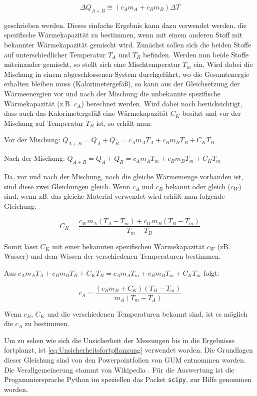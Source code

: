 \documentclass[11pt, ngerman]{scrartcl}
\begin{document}
\begin{equation}
    \Delta Q_{A+B} \cong (c_A m_A + c_B m_B) \Delta T
\end{equation}

geschrieben werden. Dieses einfache Ergebnis kann dazu verwendet werden, die
spezifische Wärmekapazität zu bestimmen, wenn mit einem anderen Stoff mit
bekannter Wärmekapazität gemischt wird. Zunächst sollen sich die beiden Stoffe
auf unterschiedlicher Temperatur $T_A$ und $T_B$ befinden. Werden nun beide Stoffe
miteinander gemischt, so stellt sich eine Mischtemperatur $T_m$ ein. Wird dabei
die Mischung in einem abgeschlossenen System durchgeführt, wo die Gesamtenergie
erhalten bleiben muss (Kalorimetergefäß), so kann aus der Gleichsetzung der
Wärmeenergien vor und nach der Mischung die unbekannte spezifische
Wärmekapazität (z.B. $c_A$) berechnet werden. Wird dabei noch berücksichtigt, dass
auch das Kalorimetergefäß eine Wärmekapazität $C_K$ besitzt und vor der Mischung
auf Temperatur $T_B$ ist, so erhält man: 

Vor der Mischung: $Q_{A+B} = Q_A + Q_B =  c_A m_A T_A + c_B m_B T_B + C_K T_B$ 

Nach der Mischung: $Q_{A+B} = Q_A + Q_B = c_A m_A T_m + c_B m_B T_m + C_K T_m$ 

Da, vor und nach der Mischung, noch die gleiche Wärmemenge vorhanden ist, sind
diese zwei Gleichungen gleich.  Wenn $c_A$ und $c_B$ bekannt oder gleich ($c_W$)
sind, wenn zB. das gleiche Material verwendet wird erhält man folgende Gleichung:

\begin{equation}
    C_K = \frac{c_W m_A (T_A-T_m) + c_W m_B (T_B-T_m)}{T_m-T_B} \label{eq:warmegefaes}
\end{equation}

Somit lässt $C_K$ mit einer bekannten spezifischen Wärmekapazität $c_W$ (zB.
Wasser) und dem Wissen der verschiedenen Temperaturen bestimmen.

Aus $c_A m_A T_A + c_B m_B T_B + C_K T_B = c_A m_A T_m + c_B m_B T_m + C_K T_m$ 
folgt:

\begin{equation}
    c_A = \frac{(c_B m_B + C_K) (T_B - T_m)}{m_A (T_m - T_A)} \label{eq:warmestoff}
\end{equation}

Wenn $c_B$, $C_K$ und die verschiedenen Temperaturen bekannt sind, 
ist es möglich die $c_A$ zu bestimmen.

Um zu sehen wie sich die Unsicherheit der Messungen bis in die Ergebnisse 
fortplanzt, ist \autoref{eq:Unsicherheitsfortpflanzung} verwendet worden.
Die Grundlagen dieser Gleichung sind von den Powerpointfolien von 
GUM entnommen worden.\cite{WolfgangKessel2004} Die Verallgemeinerung stammt von Wikipedia \cite{2020Fehler}.
Für die Auswertung ist die Progammiersprache Python im speziellen das 
Packet \verb#scipy#, zur Hilfe genommen worden.
\end{document}
